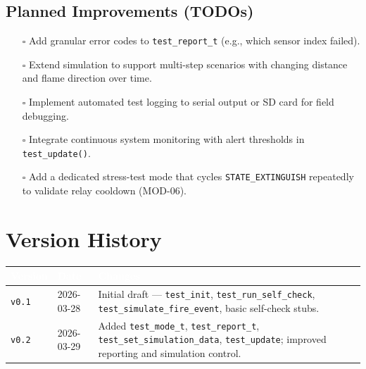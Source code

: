 \documentclass[a4paper,11pt]{article}
\newcommand{\theadtext}[1]{\textcolor{white}{\textbf{#1}}}
\begin{document}
\subsection{Planned Improvements (TODOs)}

\begin{itemize}
  \item[$\square$] Add granular error codes to \texttt{test\_report\_t} (e.g., which sensor index failed).
  \item[$\square$] Extend simulation to support multi-step scenarios with changing distance and flame direction over time.
  \item[$\square$] Implement automated test logging to serial output or SD card for field debugging.
  \item[$\square$] Integrate continuous system monitoring with alert thresholds in \texttt{test\_update()}.
  \item[$\square$] Add a dedicated stress-test mode that cycles \texttt{STATE\_EXTINGUISH} repeatedly to validate relay cooldown (MOD-06).
\end{itemize}

\section{Version History}

\begin{tabular}{L{1.7cm} L{2.55cm} L{12.75cm}}
\toprule
{}
\theadtext{Version} & \theadtext{Date} & \theadtext{Changes} \\
\midrule
{}   \texttt{v0.1} & 2026-03-28 & Initial draft --- \texttt{test\_init}, \texttt{test\_run\_self\_check}, \texttt{test\_simulate\_fire\_event}, basic self-check stubs. \\
 \texttt{v0.2} & 2026-03-29 & Added \texttt{test\_mode\_t}, \texttt{test\_report\_t}, \texttt{test\_set\_simulation\_data}, \texttt{test\_update}; improved reporting and simulation control. \\
\bottomrule
\end{tabular}
\end{document}
